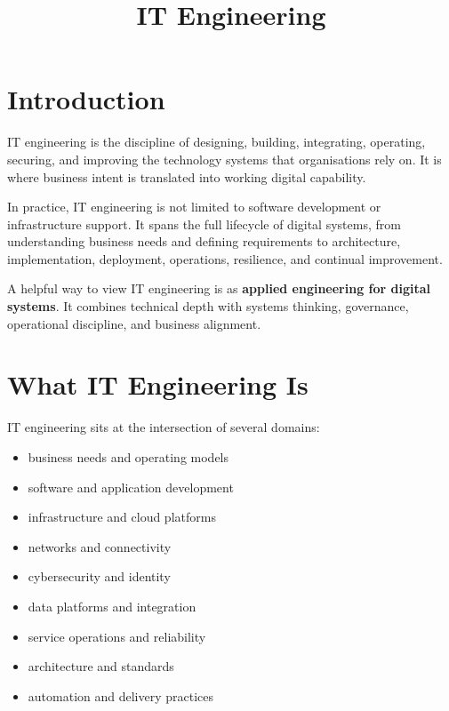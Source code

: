 \documentclass[
  british,
  letterpaper,
  DIV=11,
  numbers=noendperiod]{scrartcl}
\title{IT Engineering}
\author{}
\date{}
\providecommand{\tightlist}{%
  \setlength{\itemsep}{0pt}\setlength{\parskip}{0pt}}
\renewcommand*\contentsname{Table of contents}
\newcommand\contentsname{Table of contents}
\begin{document}
\maketitle

\renewcommand*\contentsname{Table of contents}
{
\hypersetup{linkcolor=}
\setcounter{tocdepth}{3}
\tableofcontents
}

\section{Introduction}\label{introduction}

IT engineering is the discipline of designing, building, integrating,
operating, securing, and improving the technology systems that
organisations rely on. It is where business intent is translated into
working digital capability.

In practice, IT engineering is not limited to software development or
infrastructure support. It spans the full lifecycle of digital systems,
from understanding business needs and defining requirements to
architecture, implementation, deployment, operations, resilience, and
continual improvement.

A helpful way to view IT engineering is as \textbf{applied engineering
for digital systems}. It combines technical depth with systems thinking,
governance, operational discipline, and business alignment.

\section{What IT Engineering Is}\label{what-it-engineering-is}

IT engineering sits at the intersection of several domains:

\begin{itemize}
\tightlist
\item
  business needs and operating models
\item
  software and application development
\item
  infrastructure and cloud platforms
\item
  networks and connectivity
\item
  cybersecurity and identity
\item
  data platforms and integration
\item
  service operations and reliability
\item
  architecture and standards
\item
  automation and delivery practices
\end{itemize}
\end{document}
